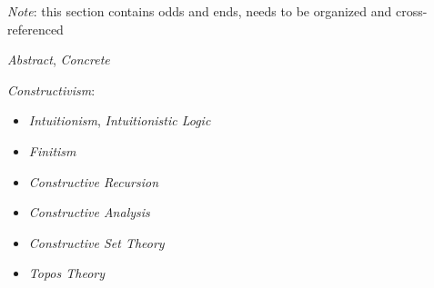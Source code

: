 \emph{Note}: this section contains odds and ends, needs to be
organized and cross-referenced

\emph{Abstract}, \emph{Concrete}

\emph{Constructivism}:
\begin{itemize}
    \item \emph{Intuitionism}, \emph{Intuitionistic Logic}
    \item \emph{Finitism}
    \item \emph{Constructive Recursion}
    \item \emph{Constructive Analysis}
    \item \emph{Constructive Set Theory}
    \item \emph{Topos Theory}
\end{itemize}
